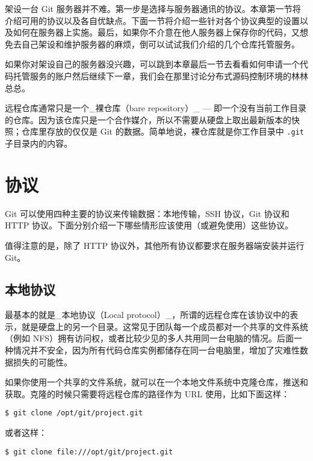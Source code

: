 \documentclass[a4paper]{book}
\begin{document}
架设一台 Git 服务器并不难。第一步是选择与服务器通讯的协议。本章第一节将介绍可用的协议以及各自优缺点。下面一节将介绍一些针对各个协议典型的设置以及如何在服务器上实施。最后，如果你不介意在他人服务器上保存你的代码，又想免去自己架设和维护服务器的麻烦，倒可以试试我们介绍的几个仓库托管服务。

如果你对架设自己的服务器没兴趣，可以跳到本章最后一节去看看如何申请一个代码托管服务的账户然后继续下一章，我们会在那里讨论分布式源码控制环境的林林总总。

远程仓库通常只是一个\_裸仓库（bare repository）\_ --- 即一个没有当前工作目录的仓库。因为该仓库只是一个合作媒介，所以不需要从硬盘上取出最新版本的快照；仓库里存放的仅仅是 Git 的数据。简单地说，裸仓库就是你工作目录中 \texttt{.git} 子目录内的内容。

\section{协议}

Git 可以使用四种主要的协议来传输数据：本地传输，SSH 协议，Git 协议和 HTTP 协议。下面分别介绍一下哪些情形应该使用（或避免使用）这些协议。

值得注意的是，除了 HTTP 协议外，其他所有协议都要求在服务器端安装并运行 Git。

\subsection{本地协议}

最基本的就是\_本地协议（Local protocol）\_，所谓的远程仓库在该协议中的表示，就是硬盘上的另一个目录。这常见于团队每一个成员都对一个共享的文件系统（例如 NFS）拥有访问权，或者比较少见的多人共用同一台电脑的情况。后面一种情况并不安全，因为所有代码仓库实例都储存在同一台电脑里，增加了灾难性数据损失的可能性。

如果你使用一个共享的文件系统，就可以在一个本地文件系统中克隆仓库，推送和获取。克隆的时候只需要将远程仓库的路径作为 URL 使用，比如下面这样：

\begin{shaded}\begin{verbatim}
$ git clone /opt/git/project.git
\end{verbatim}\end{shaded}

或者这样：

\begin{shaded}\begin{verbatim}
$ git clone file:///opt/git/project.git
\end{verbatim}\end{shaded}
\end{document}
